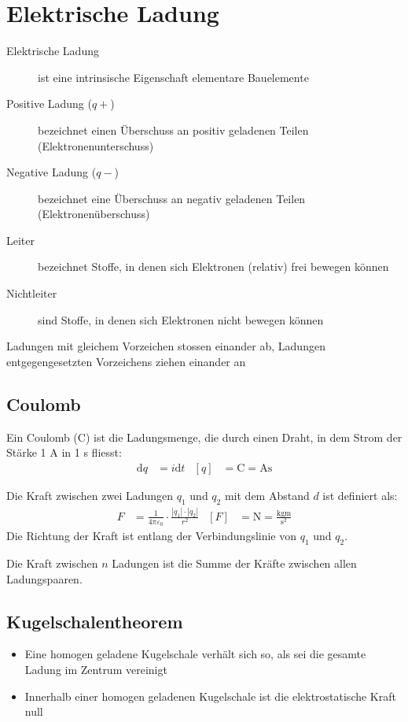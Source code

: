 \section{Elektrische Ladung}
\begin{description}
 \item [Elektrische Ladung] ist eine intrinsische Eigenschaft elementare Bauelemente
 \item [Positive Ladung ($q+$)] bezeichnet einen Überschuss an positiv geladenen Teilen (Elektronenunterschuss)
 \item [Negative Ladung ($q-$)] bezeichnet eine Überschuss an negativ geladenen Teilen (Elektronenüberschuss)
 \item [Leiter] bezeichnet Stoffe, in denen sich Elektronen (relativ) frei bewegen können
 \item [Nichtleiter] sind Stoffe, in denen sich Elektronen nicht bewegen können
\end{description}
Ladungen mit gleichem Vorzeichen stossen einander ab, Ladungen entgegengesetzten Vorzeichens ziehen einander an

\subsection{Coulomb}
Ein Coulomb (C) ist die Ladungsmenge, die durch einen Draht, in dem Strom der Stärke 1 \si{\ampere} in 1 \si{\second} fliesst: 
\begin{align*}
 \mathrm{d}q& = i \mathrm{d}t & [q]& = \si{\coulomb} = \si{\ampere}\si{\second} 
\end{align*}

Die Kraft zwischen zwei Ladungen $q_1$  und $q_2$ mit dem Abstand $d$ ist definiert als:
\begin{align*}
 F& = \frac{1}{4 \pi \varepsilon_0} \cdot \frac{|q_1| \cdot |q_2|}{r^2} & [F]& = \si{\newton} = \frac{\si{\kilogram}\si{\metre}}{\si{\second^2}}
\end{align*}
Die Richtung der Kraft ist entlang der Verbindungslinie von $q_1$ und $q_2$. 

Die Kraft zwischen $n$ Ladungen ist die Summe der Kräfte zwischen allen Ladungspaaren.

\subsection{Kugelschalentheorem}
\begin{itemize}
 \item Eine homogen geladene Kugelschale verhält sich so, als sei die gesamte Ladung im Zentrum vereinigt
 \item Innerhalb einer homogen geladenen Kugelschale ist die elektrostatische Kraft null
\end{itemize}

